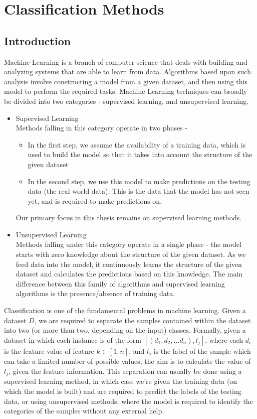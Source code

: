 \chapter{Classification Methods}
\label{chapter:Classification Methods}

\section{Introduction}
Machine Learning is a branch of computer science that deals with building and analyzing systems that are able to learn from data. Algorithms based upon such analysis involve constructing a model from a given dataset, and then using this model to perform the required tasks. Machine Learning techniques can broadly be divided into two categories - supervised learning, and unsupervised learning.
\begin{itemize}
    \item{
    Supervised Learning\\
    Methods falling in this category operate in two phases -
    \begin{itemize}
        \item{In the first step, we assume the availability of a training data, which is used to build the model so that it takes into account the structure of the given dataset}
        \item{In the second step, we use this model to make predictions on the testing data (the real world data). This is the data that the model has not seen yet, and is required to make predictions on.}
    \end{itemize}
    Our primary focus in this thesis remains on supervised learning methods.
    }
    \item{
    Unsupervised Learning\\
    Methods falling under this category operate in a single phase - the model starts with zero knowledge about the structure of the given dataset. As we feed data into the model, it continuously learns the structure of the given dataset and calculates the predictions based on this knowledge. The main difference between this family of algorithms and supervised learning algorithms is the presence/absence of training data.
    }
\end{itemize}
Classification is one of the fundamental problems in machine learning. Given a dataset $D$, we are required to separate the samples contained within the dataset into two (or more than two, depending on the input) classes. Formally, given a dataset in which each instance is of the form $[(d_1, d_2, ... d_n), l_j]$, where each $d_i$ is the feature value of feature $k \in [1, n]$, and $l_j$ is the label of the sample which can take a limited number of possible values, the aim is to calculate the value of $l_j$, given the feature information. This separation can usually be done using a supervised learning method, in which case we're given the training data (on which the model is built) and are required to predict the labels of the testing data, or using unsupervised methods, where the model is required to identify the categories of the samples without any external help.

